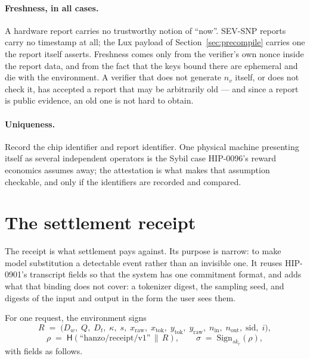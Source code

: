 \documentclass[11pt]{article}
\begin{document}
\paragraph{Freshness, in all cases.}
A hardware report carries no trustworthy notion of ``now''. SEV-SNP reports carry no timestamp at
all; the Lux payload of Section~\ref{sec:precompile} carries one the report itself asserts. Freshness
comes only from the verifier's own nonce inside the report data, and from the fact that the keys
bound there are ephemeral and die with the environment. A verifier that does not generate $n_v$
itself, or does not check it, has accepted a report that may be arbitrarily old --- and since a
report is public evidence, an old one is not hard to obtain.

\paragraph{Uniqueness.}
Record the chip identifier and report identifier. One physical machine presenting itself as several
independent operators is the Sybil case HIP-0096's reward economics assumes away; the attestation is
what makes that assumption checkable, and only if the identifiers are recorded and compared.

\section{The settlement receipt}
\label{sec:receipt}

The receipt is what settlement pays against. Its purpose is narrow: to make model substitution a
detectable event rather than an invisible one. It reuses HIP-0901's transcript fields so that the
system has one commitment format, and adds what that binding does not cover: a tokenizer digest, the
sampling seed, and digests of the input and output in the form the user sees them.

For one request, the environment signs
\[
R \;=\; \big(D_w,\; Q,\; D_t,\; \kappa,\; s,\; x_{\text{raw}},\; x_{\text{tok}},\; y_{\text{tok}},\; y_{\text{raw}},\; n_{\text{in}},\; n_{\text{out}},\; \mathrm{sid},\; i\big),
\]
\[
\rho \;=\; \mathsf{H}(\text{``hanzo/receipt/v1''} \,\|\, R), \qquad \sigma \;=\; \mathrm{Sign}_{sk_r}(\rho),
\]
with fields as follows.
\end{document}
